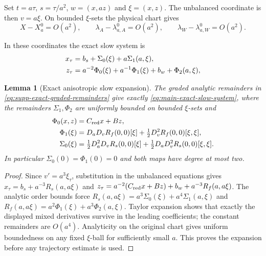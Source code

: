 \documentclass[11pt]{article}
\numberwithin{equation}{section}
\newtheorem{lemma}[lemma]{Lemma}
\theoremstyle{definition}
\theoremstyle{remark}
\begin{document}
Set $t=a\tau$, $s=\tau/a^2$, $w=(x,az)$ and $\xi=(x,z)$.
The unbalanced coordinate is then $v=a\xi$. On bounded $\xi$-sets the
physical chart gives
\begin{equation}
 X-X_a^0=O(a^2),\qquad
 \lambda_A-\lambda_{a,A}^0=O(a^2),\qquad
 \lambda_W-\lambda_{a,W}^0=O(a^2).
 \label{eq:supp-exact-slow-physical-tube}
\end{equation}

In these coordinates the exact slow system is
\begin{align}
 x_\tau&=b_s+\Sigma_0(\xi)+a\Sigma_1(a,\xi),\notag\\
 z_\tau&=a^{-2}\Phi_0(\xi)+a^{-1}\Phi_1(\xi)
             +b_w+\Phi_2(a,\xi),
 \label{eq:main-exact-slow-system}
\end{align}
\begin{lemma}[Exact anisotropic slow expansion]
\label{lem:supp-exact-slow-expansion}
The graded analytic remainders in
\eqref{eq:supp-exact-graded-remainders} give exactly
\eqref{eq:main-exact-slow-system}, where the remainders $\Sigma_1,\Phi_2$
are uniformly bounded on bounded $\xi$-sets and
\begin{equation}
 \begin{split}
 \Phi_0(x,z)&=C_{\rm red}x+Bz,\\
 \Phi_1(\xi)&=D_aD_vR_f(0,0)[\xi]
                   +\tfrac12D_v^2R_f(0,0)[\xi,\xi],\\
 \Sigma_0(\xi)&=\tfrac12D_a^2D_vR_s(0,0)[\xi]
                   +\tfrac12D_aD_v^2R_s(0,0)[\xi,\xi].
 \end{split}
 \label{eq:supp-exact-slow-coefficients}
\end{equation}
In particular $\Sigma_0(0)=\Phi_1(0)=0$ and both maps have degree at most
two.
\end{lemma}
\begin{proof}
Since $v'=a^3\xi_\tau$, substitution in the unbalanced equations gives
$x_\tau=b_s+a^{-3}R_s(a,a\xi)$ and
$z_\tau=a^{-2}(C_{\rm red}x+Bz)+b_w+a^{-3}R_f(a,a\xi)$.
The analytic order bounds force
$R_s(a,a\xi)=a^3\Sigma_0(\xi)+a^4\Sigma_1(a,\xi)$ and
$R_f(a,a\xi)=a^2\Phi_1(\xi)+a^3\Phi_2(a,\xi)$.
Taylor expansion shows that exactly the displayed mixed derivatives survive
in the leading coefficients; the constant remainders are $O(a^4)$.
Analyticity on the original chart gives uniform boundedness on any fixed
$\xi$-ball for sufficiently small $a$. This proves the expansion before any
trajectory estimate is used.
\end{proof}
\end{document}

